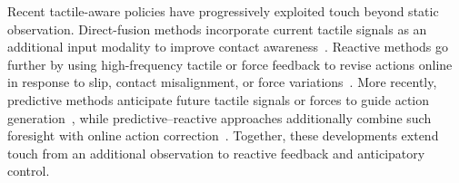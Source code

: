 Recent tactile-aware policies have progressively exploited touch beyond static observation. 
Direct-fusion methods incorporate current tactile signals as an additional input modality to improve contact awareness~\cite{huang2025tactile}. 
Reactive methods go further by using high-frequency tactile or force feedback to revise actions online in response to slip, contact misalignment, or force variations~\cite{xue2025reactive,li2026favla,niu2026t}. 
More recently, predictive methods anticipate future tactile signals or forces to guide action generation~\cite{zang2026tacforesight,niu2026learning}, while predictive--reactive approaches additionally combine such foresight with online action correction~\cite{zhou2026touchworld}. 
Together, these developments extend touch from an additional observation to reactive feedback and anticipatory control.


